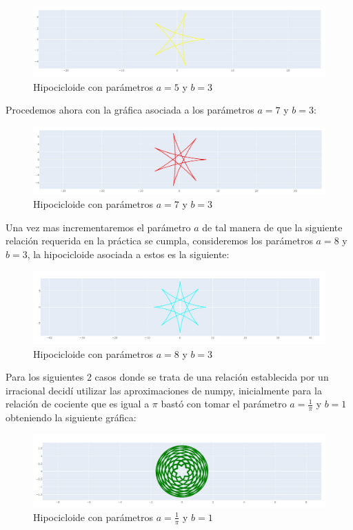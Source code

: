 \documentclass[letterpaper,11pt,dvipsnames]{article}
\begin{document}
\begin{figure}[H]
    \centering
    \includegraphics[scale=0.4]{grafica4.jpg}
    \caption{Hipocicloide con parámetros $a = 5$ y $b=3$ }
    \label{fig:sample}
\end{figure}
Procedemos ahora con la gráfica asociada a los parámetros $a = 7$ y $b=3$:

\begin{figure}[H]
    \centering
    \includegraphics[scale=0.4]{grafica5.jpg}
    \caption{Hipocicloide con parámetros $a = 7$ y $b=3$ }
    \label{fig:sample}
\end{figure}
Una vez mas incrementaremos el parámetro $a$ de tal manera de que la siguiente relación requerida en la práctica se cumpla, consideremos los parámetros $a = 8$ y $b=3$, la hipocicloide asociada a estos es la siguiente:
\begin{figure}[H]
    \centering
    \includegraphics[scale=0.4]{grafica6.jpg}
    \caption{Hipocicloide con parámetros $a = 8$ y $b=3$ }
    \label{fig:sample}
\end{figure}
\newpage
Para los siguientes 2 casos donde se trata de una relación establecida por un irracional decidí utilizar las aproximaciones de numpy, inicialmente para la relación de cociente que es igual a $\pi$ bastó con tomar el parámetro $a=\frac{1}{\pi}$ y $b=1$ obteniendo la siguiente gráfica:
\begin{figure}[H]
    \centering
    \includegraphics[scale=0.4]{grafica7.jpg}
    \caption{Hipocicloide con parámetros $a = \frac{1}{\pi}$ y $b=1$ }
    \label{fig:sample}
\end{figure}
\end{document}
